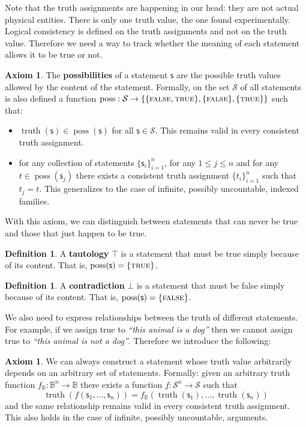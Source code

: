 \documentclass[letterpaper]{article}
\theoremstyle{plain}%
\theoremstyle{definition}
\newtheorem{defn}[thrm]{Definition}
\newtheorem{axiom}[thrm]{Axiom}
\theoremstyle{remark}
\DeclareMathOperator{\truth}{truth}
\DeclareMathOperator{\possFn}{poss}
\def\TRUE{\textsc{true}}
\def\FALSE{\textsc{false}}
\def\tautology{\top}
\def\contradiction{\bot}
\newcommand{\stmt}[1][s] {\mathsf{#1}}
\newcommand{\statement}[1] {\emph{``#1''}}
\begin{document}
Note that the truth assignments are happening in our head: they are not actual physical entities. There is only one truth value, the one found experimentally. Logical consistency is defined on the truth assignments and not on the truth value. Therefore we need a way to track whether the meaning of each statement allows it to be true or not.

\begin{axiom}\label{ax_possibilities}
	The \textbf{possibilities} of a statement $\stmt$ are the possible truth values allowed by the content of the statement. Formally, on the set $\mathcal{S}$ of all statements is also defined a function $\possFn: \mathcal{S} \to \{\{\FALSE, \TRUE\},\{\FALSE\},\{\TRUE\}\}$ such that:
	\begin{itemize}
		\item $\truth(\stmt) \in \possFn(\stmt)$ for all $\stmt \in \mathcal{S}$. This remains valid in every consistent truth assignment.
		\item for any collection of statements $\{\stmt_i\}^n_{i=1}$, for any $1 \leq j \leq n$ and for any $t \in \possFn(\stmt_j)$ there exists a consistent truth assignment $\{t_i\}^n_{i=1}$ such that $t_j = t$. This generalizes to the case of infinite, possibly uncountable, indexed families.
	\end{itemize}
\end{axiom}

With this axiom, we can distinguish between statements that can never be true and those that just happen to be true.

\begin{defn}
	A \textbf{tautology} $\tautology$ is a statement that must be true simply because of its content. That is, $\possFn(\stmt) = \{\TRUE\}$.
\end{defn}

\begin{defn}
	A \textbf{contradiction} $\contradiction$ is a statement that must be false simply because of its content. That is, $\possFn(\stmt) = \{\FALSE\}$.
\end{defn}

We also need to express relationships between the truth of different statements. For example, if we assign true to \statement{this animal is a dog} then we cannot assign true to \statement{this animal is not a dog}. Therefore we introduce the following:


\begin{axiom}\label{ax_functions_of_statement}
	We can always construct a statement whose truth value arbitrarily depends on an arbitrary set of statements. Formally: given an arbitrary truth function $f_{\mathbb{B}} : \mathbb{B}^n \to \mathbb{B}$ there exists a function $f : \mathcal{S}^n \to \mathcal{S}$ such that
	$$\truth(f(\stmt_1, ..., \stmt_n)) = f_{\mathbb{B}}(\truth(\stmt_1), ..., \truth(\stmt_n))$$
	and the same relationship remains valid in every consistent truth assignment. This also holds in the case of infinite, possibly uncountable, arguments.
\end{axiom}
\end{document}
